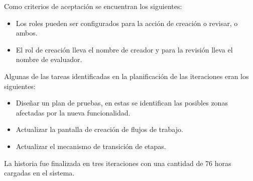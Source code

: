 Como criterios de aceptación se encuentran los siguientes:
\begin{itemize}
	\item Los roles pueden ser configurados para la acción de creación o revisar, o ambos.
	\item El rol de creación lleva el nombre de creador y para la revisión lleva el nombre de evaluador.
\end{itemize}

Algunas de las tareas identificadas en la planificación de las iteraciones eran los siguientes:
\begin{itemize}
	\item Diseñar un plan de pruebas, en estas se identifican las posibles zonas afectadas por la nueva funcionalidad.
	\item Actualizar la pantalla de creación de flujos de trabajo.
	\item Actualizar el mecanismo de transición de etapas.
\end{itemize}

La historia fue finalizada en tres iteraciones con una cantidad de 76 horas cargadas en el sistema.